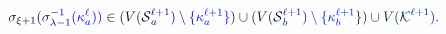 \documentclass[12pt]{article}
\begin{document}
\makeatletter
\renewcommand*{\@textcolor}[3]{%
  \protect\leavevmode
  \begingroup
    \color#1{#2}#3%
  \endgroup
}
\makeatother
\begin{displaymath}
\mathcolor[RGB]{0,0,15}{\sigma} _ { \mathcolor[RGB]{0,0,30}{\xi} \mathcolor[RGB]{0,0,45}{+} \mathcolor[RGB]{0,0,60}{1} } \mathcolor[RGB]{0,0,75}{(} \mathcolor[RGB]{0,0,90}{\sigma} _ { \mathcolor[RGB]{0,0,105}{\lambda} \mathcolor[RGB]{0,0,120}{-} \mathcolor[RGB]{0,0,135}{1} } ^ { \mathcolor[RGB]{0,0,150}{-} \mathcolor[RGB]{0,0,165}{1} } \mathcolor[RGB]{0,0,180}{(} \mathcolor[RGB]{0,0,195}{\kappa} _ { \mathcolor[RGB]{0,0,210}{a} } ^ { \mathcolor[RGB]{0,0,225}{\ell} } \mathcolor[RGB]{0,0,240}{)} \mathcolor[RGB]{0,0,255}{)} \mathcolor[RGB]{0,15,0}{\in} \mathcolor[RGB]{0,15,15}{(} \mathcolor[RGB]{0,15,30}{V} \mathcolor[RGB]{0,15,45}{(} \mathcal { \mathcolor[RGB]{0,15,60}{S} } _ { \mathcolor[RGB]{0,15,75}{a} } ^ { \mathcolor[RGB]{0,15,90}{\ell} \mathcolor[RGB]{0,15,105}{+} \mathcolor[RGB]{0,15,120}{1} } \mathcolor[RGB]{0,15,135}{)} \mathcolor[RGB]{0,15,150}{\setminus} \mathcolor[RGB]{0,15,165}{\{} \mathcolor[RGB]{0,15,180}{\kappa} _ { \mathcolor[RGB]{0,15,195}{a} } ^ { \mathcolor[RGB]{0,15,210}{\ell} \mathcolor[RGB]{0,15,225}{+} \mathcolor[RGB]{0,15,240}{1} } \mathcolor[RGB]{0,15,255}{\}} \mathcolor[RGB]{0,30,0}{)} \mathcolor[RGB]{0,30,15}{\cup} \mathcolor[RGB]{0,30,30}{(} \mathcolor[RGB]{0,30,45}{V} \mathcolor[RGB]{0,30,60}{(} \mathcal { \mathcolor[RGB]{0,30,75}{S} } _ { \mathcolor[RGB]{0,30,90}{b} } ^ { \mathcolor[RGB]{0,30,105}{\ell} \mathcolor[RGB]{0,30,120}{+} \mathcolor[RGB]{0,30,135}{1} } \mathcolor[RGB]{0,30,150}{)} \mathcolor[RGB]{0,30,165}{\setminus} \mathcolor[RGB]{0,30,180}{\{} \mathcolor[RGB]{0,30,195}{\kappa} _ { \mathcolor[RGB]{0,30,210}{b} } ^ { \mathcolor[RGB]{0,30,225}{\ell} \mathcolor[RGB]{0,30,240}{+} \mathcolor[RGB]{0,30,255}{1} } \mathcolor[RGB]{0,45,0}{\}} \mathcolor[RGB]{0,45,15}{)} \mathcolor[RGB]{0,45,30}{\cup} \mathcolor[RGB]{0,45,45}{V} \mathcolor[RGB]{0,45,60}{(} \mathcal { \mathcolor[RGB]{0,45,75}{K} } ^ { \mathcolor[RGB]{0,45,90}{\ell} \mathcolor[RGB]{0,45,105}{+} \mathcolor[RGB]{0,45,120}{1} } \mathcolor[RGB]{0,45,135}{)} \mathcolor[RGB]{0,45,150}{.}
\end{displaymath}
\end{document}
